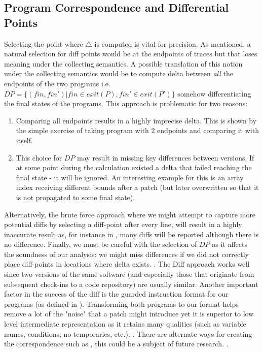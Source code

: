 \subsection{Program Correspondence and Differential Points} 
Selecting the point where $\triangle$ is computed is vital for precision. As mentioned, a natural selection for diff points would be at the endpoints of traces but that loses meaning under the collecting semantics. A possible translation of this notion under the collecting semantics would be to compute delta between \emph{all} the endpoints of the two programs i.e. $DP = \{(fin,fin') | fin \in exit(P), fin' \in exit(P') \}$ somehow differentiating the final states of the programs. This approach is problematic for two reasons:
\begin{enumerate}
\item Comparing all endpoints results in a highly imprecise delta. This is shown by the simple exercise of taking program with 2 endpoints and comparing it with itself.
\item This choice for $DP$ may result in missing key differences between versions. If at some point during the calculation existed a delta that failed reaching the final state - it will be ignored. An interesting example for this is an array index receiving different bounds after a patch (but later overwritten so that it is not propagated to some final state).
\end{enumerate}
Alternatively, the brute force approach where we might attempt to capture more potential diffs by selecting a diff-point after every line, will result in a highly inaccurate result as, for instance in , many diffs will be reported although there is no difference.
Finally, we must be careful with the selection of $DP$ as it affects the soundness of our analysis: we might miss differences if we did not correctly place diff-points in locations where delta exists.
 . The Diff approach works well since two versions of the same software (and especially those that originate from subsequent check-ins to a code repository) are usually similar. Another important factor in the success of the diff is the guarded instruction format for our programs (as defined in ). Transforming both programs to our format helps remove a lot of the "noise" that a patch might introduce yet it is superior to low level intermediate representation as it retains many qualities (such as variable names, conditions, no temporaries, etc.). . There are alternate ways for creating the correspondence such as , this could be a subject of future research. .


